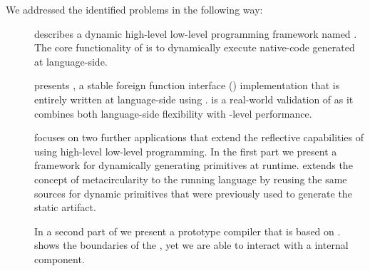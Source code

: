 We addressed the identified problems in the following way:
\begin{description}	
	
	\item[] describes a dynamic high-level low-level programming framework named \B.
	The core functionality of \B is to dynamically execute native-code generated at language-side.
		
	\item[] presents \NB, a stable foreign function interface (\FFI) implementation that is entirely written at language-side using \B.
	\NB is a real-world validation of \B as it combines both language-side flexibility with \VM-level performance.
	
	\item[] focuses on two further \B applications that extend the reflective capabilities of \PH using high-level low-level programming.
	In the first part we present \WF a framework for dynamically generating primitives at runtime.
	\WF extends the concept of metacircularity to the running language by reusing the same sources for dynamic primitives that were previously used to generate the static \VM artifact.
		
	In a second part of  we present \NBJ a prototype \JIT compiler that is based on \B.
	\NBJ shows the boundaries of the \B, yet we are able to interact with a \VM internal component.
\end{description}


